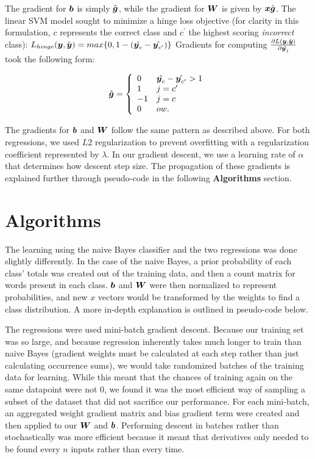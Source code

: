 \documentclass[11pt]{article}
\begin{document}
The gradient for $\boldsymbol{b}$ is simply $\hat{\boldsymbol{g}}$, while the gradient for $\boldsymbol{W}$ is given by $\boldsymbol{x}\hat{\boldsymbol{g}}$. The linear SVM model sought to minimize a hinge loss objective (for clarity in this formulation, $c$ represents the correct class and $c^\prime$ the highest scoring \textit{incorrect} class): $L_{hinge}(\boldsymbol{y}, \hat{\boldsymbol{y}}) = max\{0, 1 - (\hat{\boldsymbol{y}_c} - \hat{\boldsymbol{y}_{c^\prime}})\}$ Gradients for computing  $\frac{\partial L(\boldsymbol{y}, \hat{\boldsymbol{y}})}{\partial \hat{\boldsymbol{y}_j}}$ took the following form:

\[\hat{\boldsymbol{g}} = \left\{
\begin{array}{ll}
      0 & \hat{\boldsymbol{y}_c} - \hat{\boldsymbol{y}_{c^\prime}} > 1 \\
      1 & j = c^\prime \\
      -1 & j = c \\
      0 & ow. \\
\end{array}
\right. \]

The gradients for $\boldsymbol{b}$ and $\boldsymbol{W}$ follow the same pattern as described above. For both regressions, we used $L2$ regularization to prevent overfitting with a regularization coefficient represented by $\lambda$. In our gradient descent, we use a learning rate of $\alpha$ that determines how descent step size. The propagation of these gradients is explained further through pseudo-code in the following \textbf{Algorithms} section.

\section{Algorithms}

The learning using the naive Bayes classifier and the two regressions was done slightly differently. In the case of the naive Bayes, a prior probability of each class' totals was created out of the training data, and then a count matrix for words present in each class. $\boldsymbol{b}$ and $\boldsymbol{W}$ were then normalized to represent probabilities, and new $x$ vectors would be transformed by the weights to find a class distribution. A more in-depth explanation is outlined in pseudo-code below.

The regressions were used mini-batch gradient descent. Because our training set was so large, and because regression inherently takes much longer to train than naive Bayes (gradient weights must be calculated at each step rather than just calculating occurrence sums), we would take randomized batches of the training data for learning. While this meant that the chances of training again on the same datapoint were not 0, we found it was the most efficient way of sampling a subset of the dataset that did not sacrifice our performance. For each mini-batch, an aggregated weight gradient matrix and bias gradient term were created and then applied to our $\boldsymbol{W}$ and $\boldsymbol{b}$. Performing descent in batches rather than stochastically was more efficient because it meant that derivatives only needed to be found every $n$ inputs rather than every time.
\end{document}

